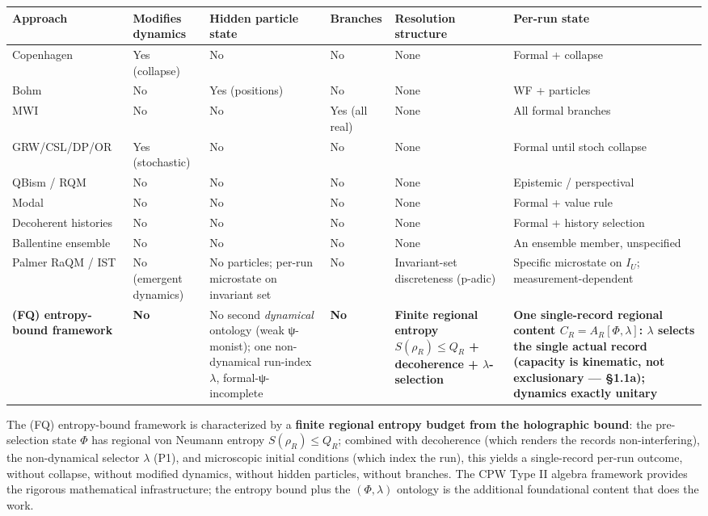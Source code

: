 \documentclass[11pt,a4paper]{article}
\begin{document}
\begin{center}
\small
\begin{tabularx}{\linewidth}{|Y|Y|Y|Y|Y|Y|}
\hline
\textbf{Approach} & \textbf{Modifies dynamics} & \textbf{Hidden particle state} & \textbf{Branches} & \textbf{Resolution structure} & \textbf{Per-run state} \\
\hline
Copenhagen & Yes (collapse) & No & No & None & Formal + collapse \\
\hline
Bohm & No & Yes (positions) & No & None & WF + particles \\
\hline
MWI & No & No & Yes (all real) & None & All formal branches \\
\hline
GRW/CSL/DP/OR & Yes (stochastic) & No & No & None & Formal until stoch collapse \\
\hline
QBism / RQM & No & No & No & None & Epistemic / perspectival \\
\hline
Modal & No & No & No & None & Formal + value rule \\
\hline
Decoherent histories & No & No & No & None & Formal + history selection \\
\hline
Ballentine ensemble & No & No & No & None & An ensemble member, unspecified \\
\hline
Palmer RaQM / IST & No (emergent dynamics) & No particles; per-run microstate on invariant set & No & Invariant-set discreteness (p-adic) & Specific microstate on $I_U$; measurement-dependent \\
\hline
\textbf{(FQ) entropy-bound framework} & \textbf{No} & No second \emph{dynamical} ontology (weak ψ-monist); one non-dynamical run-index $\lambda$, formal-ψ-incomplete & \textbf{No} & \textbf{Finite regional entropy $S(\rho_R) \le Q_R$ + decoherence + $\lambda$-selection} & \textbf{One single-record regional content $C_R = A_R[\Phi,\lambda]$: $\lambda$ selects the single actual record (capacity is kinematic, not exclusionary — §1.1a); dynamics exactly unitary} \\
\hline
\end{tabularx}
\end{center}

The (FQ) entropy-bound framework is characterized by a \textbf{finite regional entropy budget from the holographic bound}: the pre-selection state $\Phi$ has regional von Neumann entropy $S(\rho_R) \le Q_R$; combined with decoherence (which renders the records non-interfering), the non-dynamical selector $\lambda$ (P1), and microscopic initial conditions (which index the run), this yields a single-record per-run outcome, without collapse, without modified dynamics, without hidden particles, without branches. The CPW Type II algebra framework provides the rigorous mathematical infrastructure; the entropy bound plus the $(\Phi,\lambda)$ ontology is the additional foundational content that does the work.
\end{document}

